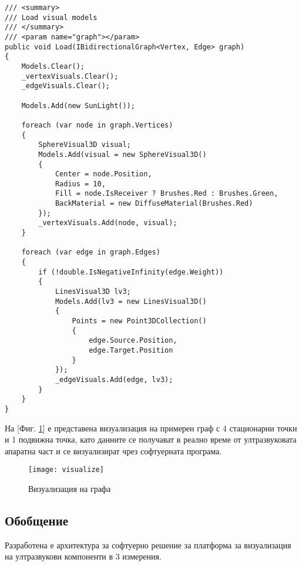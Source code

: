 \begin{lstlisting}
/// <summary>
/// Load visual models
/// </summary>
/// <param name="graph"></param>
public void Load(IBidirectionalGraph<Vertex, Edge> graph)
{
    Models.Clear();
    _vertexVisuals.Clear();
    _edgeVisuals.Clear();

    Models.Add(new SunLight());

    foreach (var node in graph.Vertices)
    {
        SphereVisual3D visual;
        Models.Add(visual = new SphereVisual3D()
        {
            Center = node.Position,
            Radius = 10,
            Fill = node.IsReceiver ? Brushes.Red : Brushes.Green,
            BackMaterial = new DiffuseMaterial(Brushes.Red)
        });
        _vertexVisuals.Add(node, visual);
    }

    foreach (var edge in graph.Edges)
    {
        if (!double.IsNegativeInfinity(edge.Weight))
        {
            LinesVisual3D lv3;
            Models.Add(lv3 = new LinesVisual3D()
            {
                Points = new Point3DCollection()
                {
                    edge.Source.Position,
                    edge.Target.Position
                }
            });
            _edgeVisuals.Add(edge, lv3);
        }
    }
}
\end{lstlisting}



На [Фиг. \ref{fig:visualize}] е представена визуализация на примерен граф с 4 стационарни точки и 1 подвижна точка, като данните се получават в реално време от ултразвуковата апаратна част и се визуализират чрез софтуерната програма.

\begin{figure}
    \centerline{\texttt{[image: visualize]}}
    \caption{Визуализация на графа}
    \label{fig:visualize}
\end{figure}

\subsection{Обобщение}
Разработена е архитектура за софтуерно решение за платформа за визуализация на ултразвукови компоненти в 3 измерения. 
